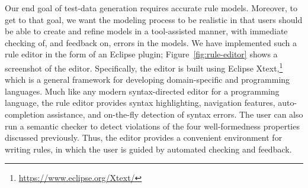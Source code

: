 Our end goal of test-data generation requires accurate rule models. Moreover, to
get to that goal, we want the modeling process to be realistic in that users
should be able to create and refine models in a tool-assisted manner, with
immediate checking of, and feedback on, errors in the models.  We have
implemented such a rule editor in the form of an Eclipse plugin;
Figure~\ref{fig:rule-editor} shows a screenshot of the editor. Specifically, the
editor is built using Eclipse Xtext,\footnote{\scriptsize
  \url{https://www.eclipse.org/Xtext/}} which is a general framework for
developing domain-specific and programming languages. Much like any modern
syntax-directed editor for a programming language, the rule editor provides
syntax highlighting, navigation features, auto-completion assistance, and
on-the-fly detection of syntax errors.  The user can also run a semantic checker
to detect violations of the four well-formedness properties discussed
previously. Thus, the editor provides a convenient environment for writing
rules, in which the user is guided by automated checking and feedback.
